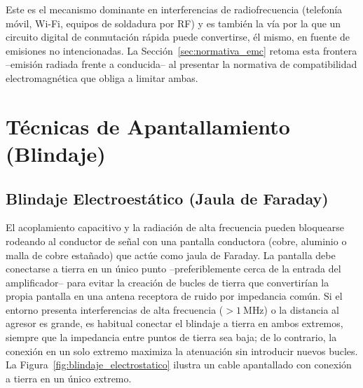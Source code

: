 Este es el mecanismo dominante en interferencias de radiofrecuencia (telefonía móvil, Wi-Fi, equipos de soldadura por RF) y es también la vía por la que un circuito digital de conmutación rápida puede convertirse, él mismo, en fuente de emisiones no intencionadas. La Sección~\ref{sec:normativa_emc} retoma esta frontera --emisión radiada frente a conducida-- al presentar la normativa de compatibilidad electromagnética que obliga a limitar ambas.


\section{Técnicas de Apantallamiento (Blindaje)}\label{sec:apantallamiento}
\subsection{Blindaje Electroestático (Jaula de Faraday)}\label{sub:blindaje_electrostatico}
El acoplamiento capacitivo y la radiación de alta frecuencia pueden bloquearse rodeando al conductor de señal con una pantalla conductora (cobre, aluminio o malla de cobre estañado) que actúe como jaula de Faraday. La pantalla debe conectarse a tierra en un único punto --preferiblemente cerca de la entrada del amplificador-- para evitar la creación de bucles de tierra que convertirían la propia pantalla en una antena receptora de ruido por impedancia común. Si el entorno presenta interferencias de alta frecuencia ($>\SI{1}{\mega\hertz}$) o la distancia al agresor es grande, es habitual conectar el blindaje a tierra en ambos extremos, siempre que la impedancia entre puntos de tierra sea baja; de lo contrario, la conexión en un solo extremo maximiza la atenuación sin introducir nuevos bucles. La Figura~\ref{fig:blindaje_electrostatico} ilustra un cable apantallado con conexión a tierra en un único extremo.

